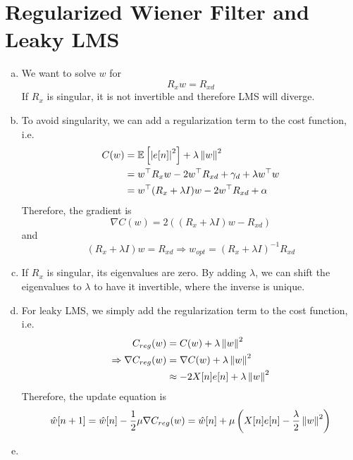 \section{Regularized Wiener Filter and Leaky LMS}\label{sec:p4}

\begin{enumerate}[(a)]
\item We want to solve $w$ for \[R_x w = R_{xd}\]
If $R_x$ is singular, it is not invertible and therefore LMS will diverge.

\item To avoid singularity, we can add a regularization term to the cost function, i.e.
\begin{align*}
	C(w) 
	&= \mathbb{E} \left[ \left\lvert e[n] \right\rvert^2 \right] + \lambda\left\lVert w \right\rVert^2 \\
	&= w^\top R_x w - 2 w^\top R_{xd} + \gamma_d + \lambda w^\top w \\
	&= w^\top (R_x + \lambda I) w - 2 w^\top R_{xd} + \alpha
\end{align*}
Therefore, the gradient is
\[\nabla C(w) = 2\left((R_x + \lambda I)w - R_{xd}\right)\]
and 
\[ (R_x + \lambda I)w = R_{xd} \Rightarrow w_{opt} = (R_x + \lambda I)^{-1} R_{xd}\]

\item If $R_x$ is singular, its eigenvalues are zero. By adding $\lambda$, we can shift the eigenvalues to $\lambda$ to have it invertible, where the inverse is unique.

\item For leaky LMS, we simply add the regularization term to the cost function, i.e. 
\begin{align*}
	C_{reg}(w) &= C(w) + \lambda \left\lVert w \right\rVert^2 \\
	\Rightarrow \nabla C_{reg}(w) &= \nabla C(w) + \lambda \left\lVert w \right\rVert^2 \\
	&\approx -2X[n]e[n] + \lambda \left\lVert w \right\rVert^2
\end{align*}
Therefore, the update equation is
\[\hat{w}[n+1] = \hat{w}[n] - \frac{1}{2} \mu \nabla C_{reg}(w) = \hat{w}[n] + \mu\left(X[n]e[n] - \frac{\lambda}{2} \left\lVert w \right\rVert^2 \right)\]

\item

\end{enumerate}